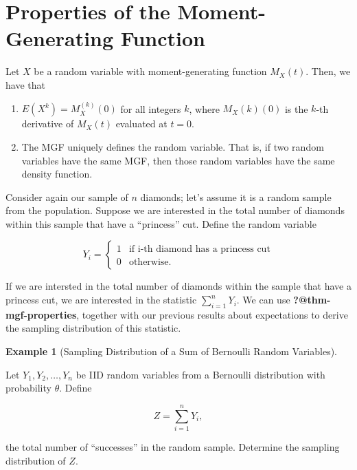\documentclass[
  letterpaper,
  DIV=11,
  numbers=noendperiod]{scrreprt}
\providecommand{\tightlist}{%
  \setlength{\itemsep}{0pt}\setlength{\parskip}{0pt}}\usepackage{longtable,booktabs,array}
\theoremstyle{plain}
\theoremstyle{definition}
\theoremstyle{definition}
\newtheorem{example}{Example}[chapter]
\theoremstyle{remark}
\begin{document}
\hypertarget{properties-of-the-moment-generating-function}{%
\section{Properties of the Moment-Generating
Function}\label{properties-of-the-moment-generating-function}}

Let \(X\) be a random variable with moment-generating function
\(M_X(t).\) Then, we have that

\begin{enumerate}
\def\labelenumi{\arabic{enumi}.}
\tightlist
\item
  \(E\left(X^k\right) = M_X^{(k)}(0)\) for all integers \(k\), where
  \(M_X(k)(0)\) is the \(k\)-th derivative of \(M_X(t)\) evaluated at
  \(t = 0\).
\item
  The MGF uniquely defines the random variable. That is, if two random
  variables have the same MGF, then those random variables have the same
  density function.
\end{enumerate}

Consider again our sample of \(n\) diamonds; let's assume it is a random
sample from the population. Suppose we are interested in the total
number of diamonds within this sample that have a ``princess'' cut.
Define the random variable

\[Y_i = \begin{cases} 1 & \text{if i-th diamond has a princess cut} \\ 0 & \text{otherwise}. \end{cases}\]

If we are intersted in the total number of diamonds within the sample
that have a princess cut, we are interested in the statistic
\(\sum_{i=1}^{n} Y_i\). We can use \textbf{?@thm-mgf-properties},
together with our previous results about expectations to derive the
sampling distribution of this statistic.

\begin{example}[Sampling Distribution of a Sum of Bernoulli Random
Variables]\protect\hypertarget{exm-bernoulli-sum}{}\label{exm-bernoulli-sum}

Let \(Y_1, Y_2, \dotsc, Y_n\) be IID random variables from a Bernoulli
distribution with probability \(\theta\). Define

\[Z = \sum_{i=1}^{n} Y_i,\]

the total number of ``successes'' in the random sample. Determine the
sampling distribution of \(Z\).

\end{example}
\end{document}
